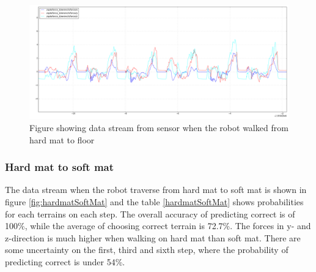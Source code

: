 \documentclass[USenglish]{ifimaster}  %
\begin{document}
\begin{figure}[h]
	\centering
	\includegraphics[width=\textwidth,height=\textheight,keepaspectratio]{Figures/MB3_3_Gulvet}
	\caption{Figure showing data stream from sensor when the robot walked from hard mat to floor}
	\label{fig:mb3Gulvet}
\end{figure}
	
	
\begin{table}[h]
	\centering
	\caption{The table showing probability of each terrain per step walking from hard mat to floor. Marked green represent correct prediction and correct terrain, red represent wrong prediction and yellow is the correct prediction if it got wrong.}
	\label{tab:mb3Gulvet}
\end{table}
\FloatBarrier
\clearpage

\subsubsection{Hard mat to soft mat} \label{sec:hmssm}
The data stream when the robot traverse from hard mat to soft mat is shown in figure \ref{fig:hardmatSoftMat} and the table \ref{hardmatSoftMat} shows probabilities for each terrains on each step. The overall accuracy of predicting correct is of 100\%, while the average of choosing correct terrain is 72.7\%. The forces in y- and z-direction is much higher when walking on hard mat than soft mat. There are some uncertainty on the first, third and sixth step, where the probability of predicting correct is under 54\%. 
\end{document}
